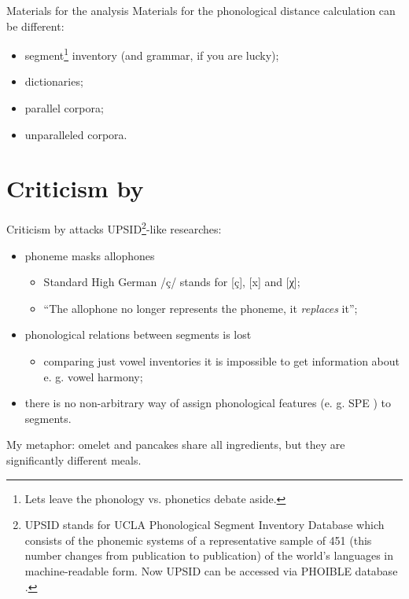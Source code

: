 \documentclass[
  ignorenonframetext,
]{beamer}
\providecommand{\tightlist}{%
  \setlength{\itemsep}{0pt}\setlength{\parskip}{0pt}}
\begin{document}
\begin{frame}{Materials for the analysis}
\protect\hypertarget{materials-for-the-analysis}{}
Materials for the phonological distance calculation can be different:

\begin{itemize}
\tightlist
\item
  segment\footnote[frame]{Lets leave the phonology vs. phonetics debate aside.}
  inventory (and grammar, if you are lucky);
\item
  dictionaries;
\item
  parallel corpora;
\item
  unparalleled corpora.
\end{itemize}

\setcounter{footnote}{0}
\end{frame}

\hypertarget{criticism-by-simpson99}{%
\section{\texorpdfstring{Criticism by
\citep{simpson99}}{Criticism by {[}@simpson99{]}}}\label{criticism-by-simpson99}}

\begin{frame}{Criticism by \citep{simpson99}}
\protect\hypertarget{criticism-by-simpson99-1}{}
\citep{simpson99} attacks
UPSID\footnote[frame]{UPSID stands for UCLA Phonological Segment Inventory Database \citep{maddieson87} which consists of the phonemic systems of a
representative sample of 451 (this number changes from publication to publication) of the world's languages in machine-readable form. Now UPSID can be accessed via PHOIBLE database \citep{phoible19}.}-like
researches:

\begin{itemize}
\tightlist
\item
  phoneme masks allophones

  \begin{itemize}
  \tightlist
  \item
    Standard High German /ç/ stands for {[}ç{]}, {[}x{]} and {[}χ{]};
  \item
    ``The allophone no longer represents the phoneme, it \emph{replaces}
    it'';
  \end{itemize}
\item
  phonological relations between segments is lost

  \begin{itemize}
  \tightlist
  \item
    comparing just vowel inventories it is impossible to get information
    about e. g. vowel harmony;
  \end{itemize}
\item
  there is no non-arbitrary way of assign phonological features (e. g.
  SPE \citep{chomsky68}) to segments. \pause
\end{itemize}

My metaphor: omelet and pancakes share all ingredients, but they are
significantly different meals.

\setcounter{footnote}{0}
\end{frame}
\end{document}
